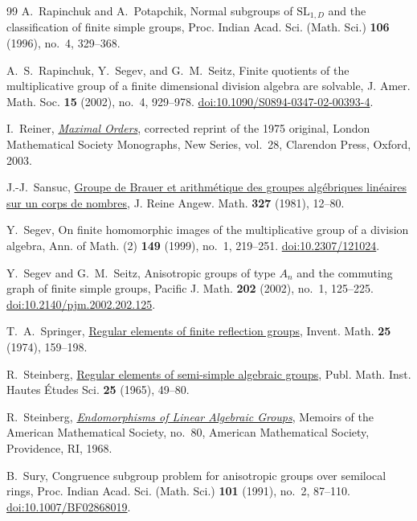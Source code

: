 \begin{thebibliography}{99}
A.~Rapinchuk and A.~Potapchik,
Normal subgroups of $\mathrm{SL}_{1,D}$
and the classification of finite simple groups,
Proc. Indian Acad. Sci. (Math. Sci.) \textbf{106} (1996), no.~4, 329--368.

A.~S.~Rapinchuk, Y.~Segev, and G.~M.~Seitz,
Finite quotients of the multiplicative group of a finite dimensional
division algebra are solvable,
J. Amer. Math. Soc. \textbf{15} (2002), no.~4, 929--978.
\href{https://doi.org/10.1090/S0894-0347-02-00393-4}{doi:10.1090/S0894-0347-02-00393-4}.

I.~Reiner,
\emph{\href{https://doi.org/10.1093/oso/9780198526735.001.0001}{Maximal
Orders}},
corrected reprint of the 1975 original,
London Mathematical Society Monographs, New Series, vol.~28,
Clarendon Press, Oxford, 2003.

J.-J.~Sansuc,
\href{https://doi.org/10.1515/crll.1981.327.12}{Groupe de Brauer et
arithm\'etique des groupes alg\'ebriques lin\'eaires sur un corps de nombres},
J. Reine Angew. Math. \textbf{327} (1981), 12--80.

Y.~Segev,
On finite homomorphic images of the multiplicative group of a division algebra,
Ann. of Math. (2) \textbf{149} (1999), no.~1, 219--251.
\href{https://doi.org/10.2307/121024}{doi:10.2307/121024}.

Y.~Segev and G.~M.~Seitz,
Anisotropic groups of type $A_n$ and the commuting graph of finite simple groups,
Pacific J. Math. \textbf{202} (2002), no.~1, 125--225.
\href{https://doi.org/10.2140/pjm.2002.202.125}{doi:10.2140/pjm.2002.202.125}.

T.~A.~Springer,
\href{https://doi.org/10.1007/BF01390173}{Regular elements of finite
reflection groups},
Invent. Math. \textbf{25} (1974), 159--198.

R.~Steinberg,
\href{https://doi.org/10.1007/BF02684397}{Regular elements of
semi-simple algebraic groups},
Publ. Math. Inst. Hautes \'Etudes Sci. \textbf{25} (1965), 49--80.

R.~Steinberg,
\emph{\href{https://doi.org/10.1090/memo/0080}{Endomorphisms of Linear
Algebraic Groups}},
Memoirs of the American Mathematical Society, no.~80,
American Mathematical Society, Providence, RI, 1968.

B.~Sury,
Congruence subgroup problem for anisotropic groups over semilocal rings,
Proc. Indian Acad. Sci. (Math. Sci.) \textbf{101} (1991), no.~2, 87--110.
\href{https://doi.org/10.1007/BF02868019}{doi:10.1007/BF02868019}.


\end{thebibliography}
